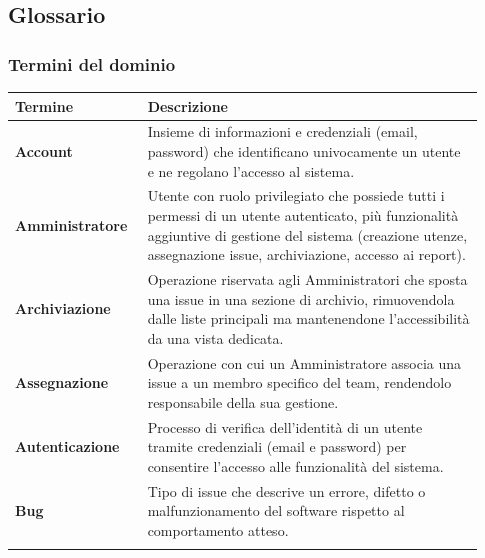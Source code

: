 \subsection{Glossario}
\label{sec:glossario}

\subsubsection{Termini del dominio}
\label{subsec:termini-dominio}

\begin{ucbox}[title=Glossario dei Termini]
\begin{longtable}{p{0.25\linewidth} p{0.68\linewidth}}
\toprule
\textbf{Termine} & \textbf{Descrizione} \\
\midrule
\endhead
\bottomrule
\endfoot

\textbf{Account} & Insieme di informazioni e credenziali (email, password) che identificano univocamente un utente e ne regolano l'accesso al sistema. \\
\addlinespace

\textbf{Amministratore} & Utente con ruolo privilegiato che possiede tutti i permessi di un utente autenticato, più funzionalità aggiuntive di gestione del sistema (creazione utenze, assegnazione issue, archiviazione, accesso ai report). \\
\addlinespace

\textbf{Archiviazione} & Operazione riservata agli Amministratori che sposta una issue in una sezione di archivio, rimuovendola dalle liste principali ma mantenendone l'accessibilità da una vista dedicata. \\
\addlinespace

\textbf{Assegnazione} & Operazione con cui un Amministratore associa una issue a un membro specifico del team, rendendolo responsabile della sua gestione. \\
\addlinespace

\textbf{Autenticazione} & Processo di verifica dell'identità di un utente tramite credenziali (email e password) per consentire l'accesso alle funzionalità del sistema. \\
\addlinespace

\textbf{Bug} & Tipo di issue che descrive un errore, difetto o malfunzionamento del software rispetto al comportamento atteso. \\
\addlinespace


\end{longtable}
\end{ucbox}
